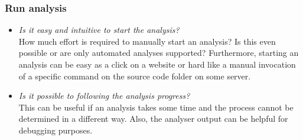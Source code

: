 \documentclass[conference]{IEEEtran}
\begin{document}
\subsubsection{Run analysis}
\label{subsubsec:evaluation_run}
\begin{itemize}
	\item \textit{Is it easy and intuitive to start the analysis?} \\
	How much effort is required to manually start an analysis? Is this even possible or are only automated analyses supported? Furthermore, starting an analysis can be easy as a click on a website or hard like a manual invocation of a specific command on the source code folder on some server.
	
	\item \textit{Is it possible to following the analysis progress?} \\
	This can be useful if an analysis takes some time and the process cannot be determined in a different way. Also, the analyser output can be helpful for debugging purposes.
\end{itemize}
\end{document}
